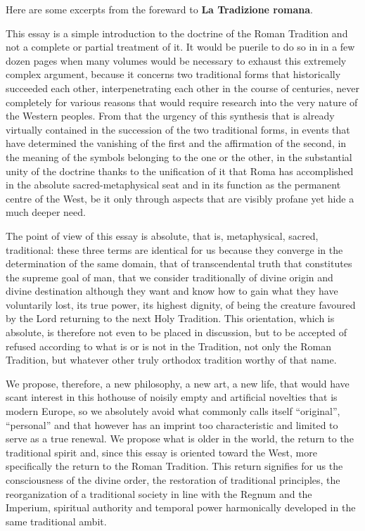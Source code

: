 Here are some excerpts from the foreward to \textbf{La Tradizione romana}.

\begin{quotationx}
This essay is a simple introduction to the doctrine of the Roman Tradition and not a complete or partial treatment of it. It would be puerile to do so in in a few dozen pages when many volumes would be necessary to exhaust this extremely complex argument, because it concerns two traditional forms that historically succeeded each other, interpenetrating each other in the course of centuries, never completely for various reasons that would require research into the very nature of the Western peoples. From that the urgency of this synthesis that is already virtually contained in the succession of the two traditional forms, in events that have determined the vanishing of the first and the affirmation of the second, in the meaning of the symbols belonging to the one or the other, in the substantial unity of the doctrine thanks to the unification of it that Roma has accomplished in the absolute sacred-metaphysical seat and in its function as the permanent centre of the West, be it only through aspects that are visibly profane yet hide a much deeper need.

The point of view of this essay is absolute, that is, metaphysical, sacred, traditional: these three terms are identical for us because they converge in the determination of the same domain, that of transcendental truth that constitutes the supreme goal of man, that we consider traditionally of divine origin and divine destination although they want and know how to gain what they have voluntarily lost, its true power, its highest dignity, of being the creature favoured by the Lord returning to the next Holy Tradition. This orientation, which is absolute, is therefore not even to be placed in discussion, but to be accepted of refused according to what is or is not in the Tradition, not only the Roman Tradition, but whatever other truly orthodox tradition worthy of that name.

We propose, therefore, a new philosophy, a new art, a new life, that would have scant interest in this hothouse of noisily empty and artificial novelties that is modern Europe, so we absolutely avoid what commonly calls itself ``original'', ``personal'' and that however has an imprint too characteristic and limited to serve as a true renewal. We propose what is older in the world, the return to the traditional spirit and, since this essay is oriented toward the West, more specifically the return to the Roman Tradition. This return signifies for us the consciousness of the divine order, the restoration of traditional principles, the reorganization of a traditional society in line with the Regnum and the Imperium, spiritual authority and temporal power harmonically developed in the same traditional ambit.


\end{quotationx}
